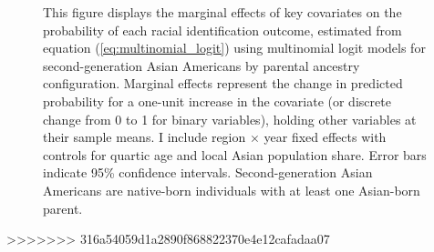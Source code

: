 \begin{center}
\begin{figure}[!htb]
\caption*{\footnotesize{This figure displays the marginal effects of key covariates on the probability of each racial identification outcome, estimated from equation (\ref{eq:multinomial_logit}) using multinomial logit models for second-generation Asian Americans by parental ancestry configuration. Marginal effects represent the change in predicted probability for a one-unit increase in the covariate (or discrete change from 0 to 1 for binary variables), holding other variables at their sample means. I include region $\times$ year fixed effects with controls for quartic age and local Asian population share. Error bars indicate 95\% confidence intervals. Second-generation Asian Americans are native-born individuals with at least one Asian-born parent.}}
\end{figure}
\end{center}

\pagebreak
\newpage
>>>>>>> 316a54059d1a2890f868822370e4e12cafadaa07

